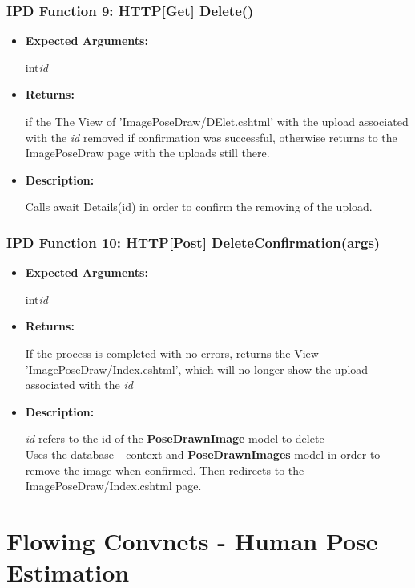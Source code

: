 \documentclass{scrreprt}
\begin{document}
\subsubsection{IPD Function 9: HTTP[Get] Delete()}
\begin{itemize}
    \item \textbf{Expected Arguments:}

    int\quad\textit{id}

    \item \textbf{Returns:}

    if the The View of 'ImagePoseDraw/DElet.cshtml' with the upload associated with the \textit{id} removed if confirmation was successful, otherwise returns to the ImagePoseDraw page with the uploads still there.

    \item \textbf{Description:}

    Calls await Details(id) in order to confirm the removing of the upload.
\end{itemize}



\subsubsection{IPD Function 10: HTTP[Post] DeleteConfirmation(args)}
\begin{itemize}
    \item \textbf{Expected Arguments:}

    int\quad\textit{id}

    \item \textbf{Returns:}

    If the process is completed with no errors, returns the View 'ImagePoseDraw/Index.cshtml', which will no longer show the upload associated with the \textit{id}

    \item \textbf{Description:}

    \textit{id} refers to the id of the \textbf{PoseDrawnImage} model to delete
    \\
    Uses the database \_context and \textbf{PoseDrawnImages} model in order to remove the image when confirmed. Then redirects to the ImagePoseDraw/Index.cshtml page.

\end{itemize}

\break

\section{Flowing Convnets - Human Pose Estimation}
\end{document}
